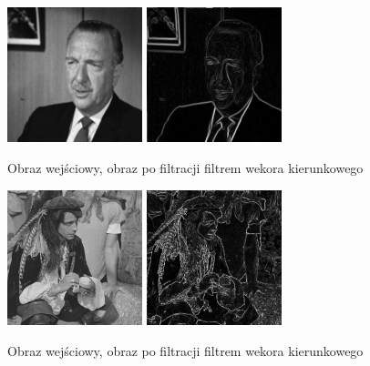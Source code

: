 \documentclass[final,a4paper,openany,12pt]{mwbk}
\begin{document}
\begin{figure}[H]
	\begin{center}
		\includegraphics[width=0.35\textwidth]{gentelman_gray}
		\includegraphics[width=0.35\textwidth]{gentelman_gray_vdgPrewitt_result}
	\end{center}
	\caption{Obraz wejściowy, obraz po filtracji filtrem wekora kierunkowego}
\end{figure}

\begin{figure}[H]
	\begin{center}
		\includegraphics[width=0.35\textwidth]{pirate_gray}
		\includegraphics[width=0.35\textwidth]{pirate_gray_vdgPrewitt_result}
	\end{center}
	\caption{Obraz wejściowy, obraz po filtracji filtrem wekora kierunkowego}
\end{figure}
\end{document}
